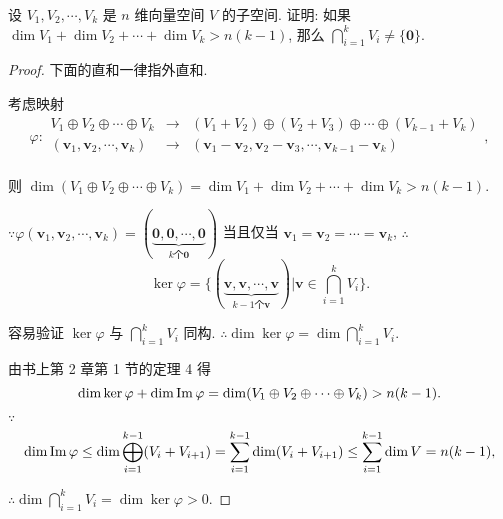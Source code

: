 \documentclass[color=black,device=normal,lang=cn,mode=geye]{elegantnote}
\begin{document}
\addtocounter{exercise}{2}
\begin{exercise}%
    设 $V_1,V_2,\cdots,V_k$ 是 $n$ 维向量空间 $V$ 的子空间. 证明: 如果 $\dim V_1+\dim V_2+\cdots+\dim V_k>n(k-1)$, 那么 $\bigcap\limits_{i=1}^kV_i\neq\{\boldsymbol{0}\}$.
\end{exercise}
\begin{proof}
    下面的直和一律指外直和.

    考虑映射
    \[\varphi:\begin{array}{rcl}
        V_1\oplus V_2\oplus\cdots\oplus V_k & \to & (V_1+V_2)\oplus(V_2+V_3)\oplus\cdots\oplus(V_{k-1}+V_k) \\
        (\boldsymbol{v}_1,\boldsymbol{v}_2,\cdots,\boldsymbol{v}_k) & \to & (\boldsymbol{v}_1-\boldsymbol{v}_2,\boldsymbol{v}_2-\boldsymbol{v}_3,\cdots,\boldsymbol{v}_{k-1}-\boldsymbol{v}_k) \\
    \end{array},\]

    则 $\dim(V_1\oplus V_2\oplus\cdots\oplus V_k)=\dim V_1+\dim V_2+\cdots+\dim V_k>n(k-1)$.

    $\because\varphi(\boldsymbol{v}_1,\boldsymbol{v}_2,\cdots,\boldsymbol{v}_k)=(\underbrace{\boldsymbol{0},\boldsymbol{0},\cdots,\boldsymbol{0}}_{k\text{个}\boldsymbol{0}})$ 当且仅当 $\boldsymbol{v}_1=\boldsymbol{v}_2=\cdots=\boldsymbol{v}_k$, $\therefore$
    \[\ker\varphi=\bigg\{(\underbrace{\boldsymbol{v},\boldsymbol{v},\cdots,\boldsymbol{v}}_{k-1\text{个}\boldsymbol{v}})\bigg|\boldsymbol{v}\in\bigcap\limits_{i=1}^kV_i\bigg\}.\]

    容易验证 $\ker\varphi$ 与 $\bigcap\limits_{i=1}^kV_i$ 同构. $\therefore\dim\ker\varphi=\dim\bigcap\limits_{i=1}^kV_i$.

    由书上第 2 章第 1 节的定理 4 得
    \[\dim\ker\varphi+\dim\operatorname{Im} \varphi=\dim(V_1\oplus V_2\oplus\cdots\oplus V_k)>n(k-1).\]

    $\because$
    \[\dim\operatorname{Im} \varphi\leq\dim\bigoplus\limits_{i=1}^{k-1}(V_i+V_{i+1})=\sum\limits_{i=1}^{k-1}\dim(V_i+V_{i+1})\leq\sum\limits_{i=1}^{k-1}\dim V=n(k-1),\]

    $\therefore\dim\bigcap\limits_{i=1}^kV_i=\dim\ker\varphi>0$.
\end{proof}
\end{document}
